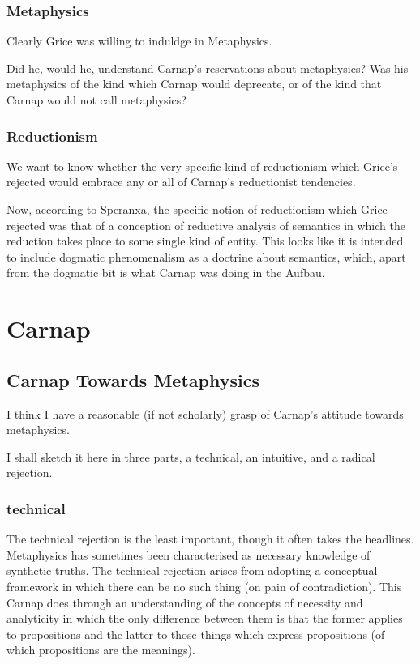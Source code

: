 \documentclass[10pt,titlepage]{book}
\begin{document}
\subsection{Metaphysics}

Clearly Grice was willing to induldge in Metaphysics.

Did he, would he, understand Carnap's reservations about metaphysics?
Was his metaphysics of the kind which Carnap would deprecate, or of the kind that Carnap would not call metaphysics?

\subsection{Reductionism}

We want to know whether the very specific kind of reductionism which Grice's rejected would embrace any or all of Carnap's reductionist tendencies.

Now, according to Speranxa, the specific notion of reductionism which Grice rejected was that of a conception of reductive analysis of semantics in which the reduction takes place to some single kind of entity.
This looks like it is intended to include dogmatic phenomenalism as a doctrine about semantics, which, apart from the dogmatic bit is what Carnap was doing in the Aufbau.



\chapter{Carnap}

\section{Carnap Towards Metaphysics}

I think I have a reasonable (if not scholarly) grasp of Carnap's attitude towards metaphysics.

I shall sketch it here in three parts, a technical, an intuitive, and a radical rejection.

\subsection{technical}
The technical rejection is the least important, though it often takes the headlines.
Metaphysics has sometimes been characterised as necessary knowledge of synthetic truths.
The technical rejection arises from adopting a conceptual framework in which there can be no such thing (on pain of contradiction).
This Carnap does through an understanding of the concepts of necessity and analyticity in which the only difference between them is that the former applies to propositions and the latter to those things which express propositions (of which propositions are the meanings).
\end{document}
